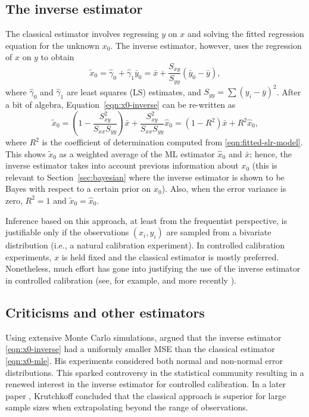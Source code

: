 \documentclass[cmfont,usenames,dvipsnames,leqno]{afit-etd}\usepackage[]{graphicx}\usepackage[]{color}
\newcommand{\wh}[1]{\ensuremath{\widehat{#1}}}
\newcommand{\wt}[1]{\ensuremath{\widetilde{#1}}}
\begin{document}
\subsection{The inverse estimator}
\label{sec:inverse-estimator}
The classical estimator involves regressing $y$ on $x$ and solving the fitted regression equation for the unknown $x_0$. The inverse estimator, however, uses the regression of $x$ on $y$ to obtain
\begin{equation}
\label{eqn:x0-inverse}
  \wt{x}_0 = \wh{\gamma}_0 + \wh{\gamma}_1 \bar{y}_0 = \bar{x} + \frac{S_{xy}}{S_{yy}}(\bar{y}_0 - \bar{y}),
\end{equation}
where $\wh{\gamma}_0$ and $\wh{\gamma}_1$ are least squares (LS) estimates, and $S_{yy} = \sum(y_i-\bar{y})^2$. After a bit of algebra, Equation~\eqref{eqn:x0-inverse} can be re-written as
\begin{equation}
\label{eqn:x0-inverse2}
  \wt{x}_0 = \left(1-\frac{S_{xy}^2}{S_{xx}S_{yy}}\right)\bar{x} + \frac{S_{xy}^2}{S_{xx}S_{yy}}\wh{x}_0 = \left(1-R^2\right)\bar{x} + R^2\wh{x}_0,
\end{equation}
where $R^2$ is the coefficient of determination computed from \eqref{eqn:fitted-slr-model}. This shows $\wt{x}_0$ as a weighted average of the ML estimator $\wh{x}_0$ and $\bar{x}$; hence, the inverse estimator takes into account previous information about $x_0$ (this is relevant to Section~\ref{sec:bayesian} where the inverse estimator is shown to be Bayes with respect to a certain prior on $x_0$). Also, when the error variance is zero, $R^2 = 1$ and $\wt{x}_0 = \wh{x}_0$. 

Inference based on this approach, at least from the frequentist perspective, is justifiable only if the observations $(x_i, y_i)$ are sampled from a bivariate distribution (i.e., a natural calibration experiment). In controlled calibration experiments, $x$ is held fixed and the classical estimator is mostly preferred. Nonetheless, much effort has gone into justifying the use of the inverse estimator in controlled calibration (see, for example, \citet{krutchkoff_classical_1967} and more recently \citet{kannan_comparison_2007}).

\subsection{Criticisms and other estimators}
\label{sec:criticisms}
Using extensive Monte Carlo simulations, \citet{krutchkoff_classical_1967} argued that the inverse estimator \eqref{eqn:x0-inverse} had a uniformly smaller MSE than the classical estimator \eqref{eqn:x0-mle}. His experiments considered both normal and non-normal error distributions. This sparked controversy in the statistical community resulting in a renewed interest in the inverse estimator for controlled calibration. In a later paper \citep{krutchkoff_classical_1969}, Krutchkoff concluded that the classical approach is superior for large sample sizes when extrapolating beyond the range of observations. 
\end{document}
